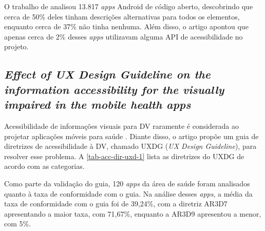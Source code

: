 O trabalho de  analisou 13.817 \emph{apps} Android de código aberto, descobrindo que cerca de 50\% deles tinham descrições alternativas para todos os elementos, enquanto cerca de 37\% não tinha nenhuma.
Além disso, o artigo apontou que apenas cerca de 2\% desses \emph{apps} utilizavam alguma API de acessibilidade no projeto.

\subsection{\emph{Effect of UX Design Guideline on the information accessibility for the visually impaired in the mobile health apps}}

Acessibilidade de informações visuais para DV raramente é considerada ao projetar aplicações móveis para saúde \cite{Kim20191103}.
Diante disso, o artigo propõe um guia de diretrizes de acessibilidade à DV, chamado UXDG (\emph{UX Design Guideline}), para resolver esse problema.
A \autoref{tab-acc-dir-uxd-1} lista as diretrizes do UXDG de acordo com as categorias.

Como parte da validação do guia, 120 \emph{apps} da área de saúde foram analisados quanto à taxa de conformidade com o guia.
Na análise desses \emph{apps}, a média da taxa de conformidade com o guia foi de 39,24\%, com a diretriz AR3D7 apresentando
a maior taxa, com 71,67\%, enquanto a AR3D9 apresentou a menor, com 5\%.

